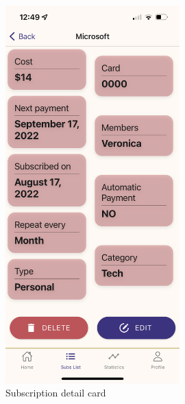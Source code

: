 \documentclass[12pt]{article}
\begin{document}
\begin{figure}[h!]
\begin{minipage}[c]{0.45\textwidth}
        \includegraphics[width=0.6\textwidth, clip]{../../assets/smartphone/detail.PNG}
        \caption{Subscription detail card}
        \label{fig:detail}
    \end{minipage}
\end{figure}
\end{document}

